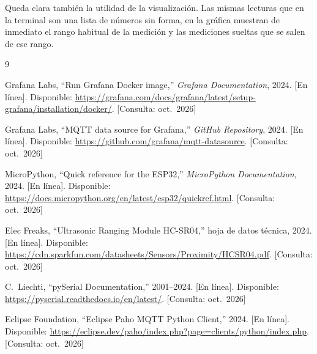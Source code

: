 Queda clara también la utilidad de la visualización. Las mismas lecturas que en la
terminal son una lista de números sin forma, en la gráfica muestran de inmediato el
rango habitual de la medición y las mediciones sueltas que se salen de ese rango.

\clearpage
\begingroup
\small
\begin{thebibliography}{9}

Grafana Labs, ``Run Grafana Docker image,'' \emph{Grafana Documentation}, 2024.
[En línea]. Disponible:
\url{https://grafana.com/docs/grafana/latest/setup-grafana/installation/docker/}.
[Consulta: oct.~2026]

Grafana Labs, ``MQTT data source for Grafana,'' \emph{GitHub Repository}, 2024.
[En línea]. Disponible: \url{https://github.com/grafana/mqtt-datasource}.
[Consulta: oct.~2026]

MicroPython, ``Quick reference for the ESP32,'' \emph{MicroPython Documentation},
2024. [En línea]. Disponible:
\url{https://docs.micropython.org/en/latest/esp32/quickref.html}.
[Consulta: oct.~2026]

Elec Freaks, ``Ultrasonic Ranging Module HC-SR04,'' hoja de datos técnica, 2024.
[En línea]. Disponible:
\url{https://cdn.sparkfun.com/datasheets/Sensors/Proximity/HCSR04.pdf}.
[Consulta: oct.~2026]

C.~Liechti, ``pySerial Documentation,'' 2001--2024. [En línea]. Disponible:
\url{https://pyserial.readthedocs.io/en/latest/}. [Consulta: oct.~2026]

Eclipse Foundation, ``Eclipse Paho MQTT Python Client,'' 2024. [En línea].
Disponible:
\url{https://eclipse.dev/paho/index.php?page=clients/python/index.php}.
[Consulta: oct.~2026]

\end{thebibliography}
\endgroup


